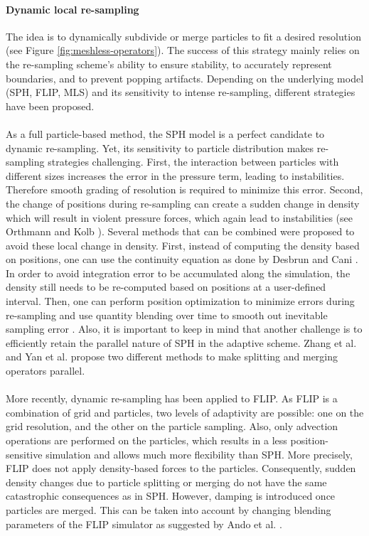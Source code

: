 \paragraph*{Dynamic local re-sampling} The idea is to dynamically subdivide or merge particles to fit a desired resolution (see Figure \ref{fig:meshless-operators}). The success of this strategy mainly relies on the re-sampling scheme's ability to ensure stability, to accurately represent boundaries, and to prevent popping artifacts. Depending on the underlying model (SPH, FLIP, MLS) and its sensitivity to intense re-sampling, different strategies have been proposed.
\\ \\
As a full particle-based method, the SPH model is a perfect candidate to dynamic re-sampling. Yet, its sensitivity to particle distribution makes re-sampling strategies challenging. First, the interaction between particles with different sizes increases the error in the pressure term, leading to instabilities. Therefore smooth grading of resolution is required to minimize this error. Second, the change of positions during re-sampling can create a sudden change in density which will result in violent pressure forces, which again lead to instabilities (see Orthmann and Kolb \cite{Orthmann2012}).
Several methods that can be combined were proposed to avoid these local change in density. First, instead of computing the density based on positions, one can use the continuity equation as done by Desbrun and Cani \cite{Desbrun1999}. In order to avoid integration error to be accumulated along the simulation, the density still needs to be re-computed based on positions at a user-defined interval. Then, one can perform position optimization to minimize errors during re-sampling \cite{Adams2007} and use quantity blending over time to smooth out inevitable sampling error \cite{Orthmann2012}.
Also, it is important to keep in mind that another challenge is to efficiently retain the parallel nature of SPH in the adaptive scheme. Zhang et al. \cite{Zhang2008} and Yan et al. \cite{Yan2009} propose two different methods to make splitting and merging operators parallel.
\\ \\
More recently, dynamic re-sampling has been applied to FLIP. As FLIP is a combination of grid and particles, two levels of adaptivity are possible: one on the grid resolution, and the other on the particle sampling. Also, only advection operations are performed on the particles, which results in a less position-sensitive simulation and allows much more flexibility than SPH. More precisely, FLIP does not apply density-based forces to the particles. Consequently, sudden density changes due to particle splitting or merging do not have the same catastrophic consequences as in SPH. However, damping is introduced once particles are merged. This can be taken into account by changing blending parameters of the FLIP simulator as suggested by Ando et al. \cite{Ando2012}.
